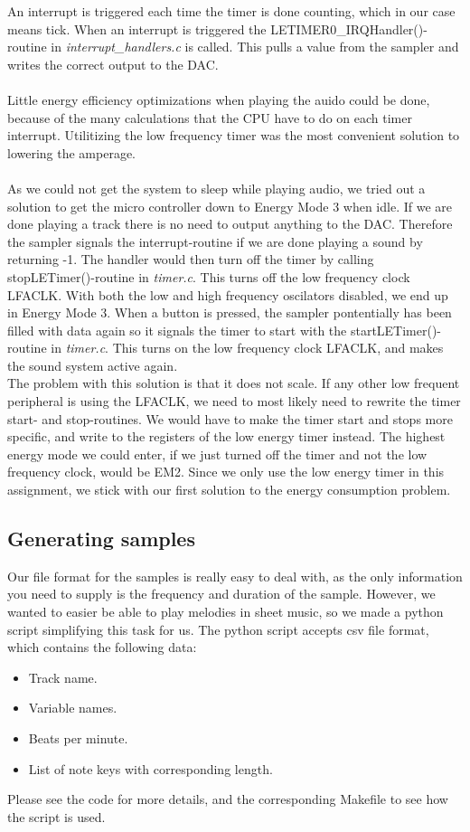 An interrupt is triggered each time the timer is done counting, which in our case means tick. When an interrupt is triggered the LETIMER0\_IRQHandler()-routine in \emph{interrupt\_handlers.c} is called. This pulls a value from the sampler and writes the correct output to the DAC. \\
\\
Little energy efficiency optimizations when playing the auido could be done, because of the many calculations that the CPU have to do on each timer interrupt. Utilitizing the low frequency timer was the most convenient solution to lowering the amperage.\\
\\
As we could not get the system to sleep while playing audio, we tried out a solution to get the micro controller down to Energy Mode 3 when idle. If we are done playing a track there is no need to output anything to the DAC. Therefore the sampler signals the interrupt-routine if we are done playing a sound by returning -1. The handler would then turn off the timer by calling stopLETimer()-routine in \emph{timer.c}. This turns off the low frequency clock LFACLK. With both the low and high frequency oscilators disabled, we end up in Energy Mode 3.
When a button is pressed, the sampler pontentially has been filled with data again so it signals the timer to start with the startLETimer()-routine in \emph{timer.c}. This turns on the low frequency clock LFACLK, and makes the sound system active again.
\\
The problem with this solution is that it does not scale. If any other low frequent peripheral is using the LFACLK, we need to most likely need to rewrite the timer start- and stop-routines. We would have to make the timer start and stops more specific, and write to the registers of the low energy timer instead. The highest energy mode we could enter, if we just turned off the timer and not the low frequency clock, would be EM2. Since we only use the low energy timer in this assignment, we stick with our first solution to the energy consumption problem. 
 



\subsection{Generating samples}
Our file format for the samples is really easy to deal with, as the only information you need to supply is the frequency and duration of the sample. However, we wanted to easier be able to play melodies in sheet music, so we made a python script simplifying this task for us. The python script accepts csv file format, which contains the following data:
\begin{itemize}
	\item Track name.
	\item Variable names.
	\item Beats per minute.
	\item List of note keys with corresponding length.
\end{itemize}

Please see the code for more details, and the corresponding Makefile to see how the script is used.

